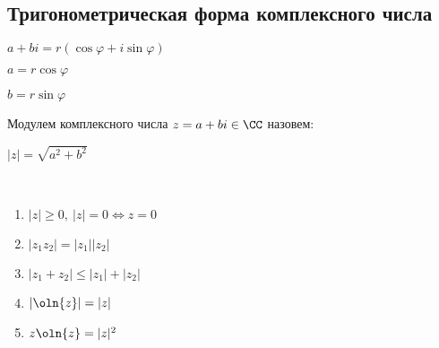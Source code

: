 \subsection{Тригонометрическая форма комплексного числа}

\begin{defn}
    
    $a + bi = r(\cos\varphi + i\sin\varphi)$
    
    $a = r\cos\varphi$
    
    $b = r\sin\varphi$
\end{defn}

\begin{defn}
    Модулем комплексного числа $z = a + bi \in \CC$ назовем:
    
    $|z| = \sqrt{a^2 + b^2}$
\end{defn}

\begin{theorem-non}~
    \begin{enumerate}
        \item $|z| \geq 0,~|z| = 0 \iff z = 0$
        
        \item $|z_1 z_2| = |z_1||z_2|$
        
        \item $|z_1 + z_2| \leq |z_1| + |z_2|$
        
        \item $|\oln{z}| = |z|$
        
        \item $z \oln{z} = |z|^2$
    \end{enumerate}
\end{theorem-non}

